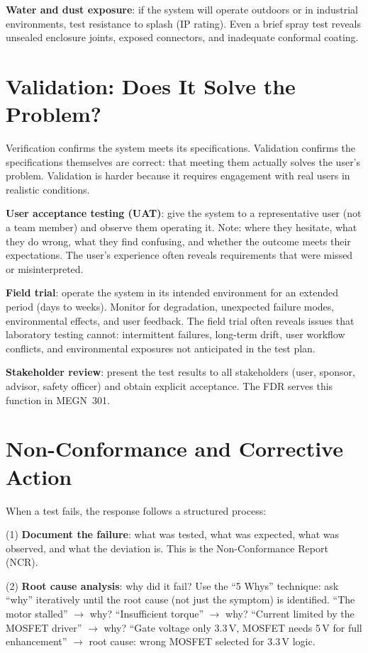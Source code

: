 \documentclass[11pt,letterpaper,twoside,openany]{book}
\begin{document}
\textbf{Water and dust exposure}: if the system will operate outdoors or in industrial environments, test resistance to splash (IP rating). Even a brief spray test reveals unsealed enclosure joints, exposed connectors, and inadequate conformal coating.

\section{Validation: Does It Solve the Problem?}
Verification confirms the system meets its specifications. Validation confirms the specifications themselves are correct: that meeting them actually solves the user's problem. Validation is harder because it requires engagement with real users in realistic conditions.

\textbf{User acceptance testing (UAT)}: give the system to a representative user (not a team member) and observe them operating it. Note: where they hesitate, what they do wrong, what they find confusing, and whether the outcome meets their expectations. The user's experience often reveals requirements that were missed or misinterpreted.

\textbf{Field trial}: operate the system in its intended environment for an extended period (days to weeks). Monitor for degradation, unexpected failure modes, environmental effects, and user feedback. The field trial often reveals issues that laboratory testing cannot: intermittent failures, long-term drift, user workflow conflicts, and environmental exposures not anticipated in the test plan.

\textbf{Stakeholder review}: present the test results to all stakeholders (user, sponsor, advisor, safety officer) and obtain explicit acceptance. The FDR serves this function in MEGN~301.

\section{Non-Conformance and Corrective Action}
When a test fails, the response follows a structured process:

(1) \textbf{Document the failure}: what was tested, what was expected, what was observed, and what the deviation is. This is the Non-Conformance Report (NCR).

(2) \textbf{Root cause analysis}: why did it fail? Use the ``5 Whys'' technique: ask ``why'' iteratively until the root cause (not just the symptom) is identified. ``The motor stalled'' $\to$ why? ``Insufficient torque'' $\to$ why? ``Current limited by the MOSFET driver'' $\to$ why? ``Gate voltage only 3.3\,V, MOSFET needs 5\,V for full enhancement'' $\to$ root cause: wrong MOSFET selected for 3.3\,V logic.
\end{document}
